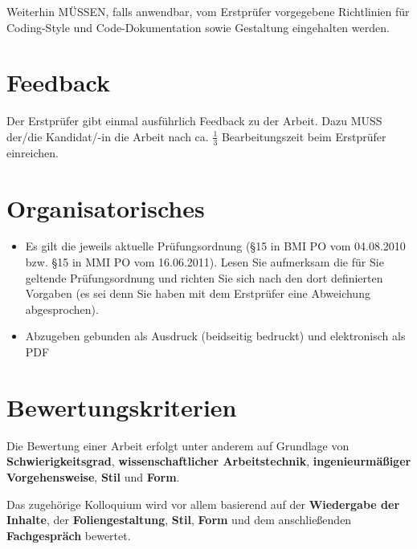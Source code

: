 Weiterhin MÜSSEN, falls anwendbar, vom Erstprüfer vorgegebene Richtlinien für Coding-Style
und Code-Dokumentation sowie Gestaltung eingehalten werden.

\section{Feedback}
Der Erstprüfer gibt einmal ausführlich Feedback zu der Arbeit. Dazu MUSS der/die Kan\-di\-dat/-in
die Arbeit nach ca. $\frac{1}{3}$ Bearbeitungszeit beim Erstprüfer einreichen.

\section{Organisatorisches}

\begin{itemize}
 \item Es gilt die jeweils aktuelle Pr\"ufungsordnung (\S 15 in BMI PO vom 04.08.2010 bzw. \S 15 in MMI PO vom 16.06.2011).
 Lesen Sie aufmerksam die für Sie geltende Prüfungsordnung und richten Sie sich nach den dort
 definierten Vorgaben (es sei denn Sie haben mit dem Erstprüfer eine Abweichung abgesprochen).
 \item Abzugeben gebunden als Ausdruck (beidseitig bedruckt) und elektronisch als PDF
\end{itemize}

\section{Bewertungskriterien}

Die Bewertung einer Arbeit erfolgt unter anderem auf Grundlage von \textbf{Schwierigkeitsgrad},
\textbf{wissenschaftlicher Arbeitstechnik}, \textbf{ingenieurmäßiger Vorgehensweise}, \textbf{Stil} und \textbf{Form}.

\noindent
Das zugehörige Kolloquium wird vor allem basierend auf der \textbf{Wiedergabe der Inhalte}, der \textbf{Foliengestaltung},
\textbf{Stil}, \textbf{Form} und dem anschließenden \textbf{Fachgespräch} bewertet.
